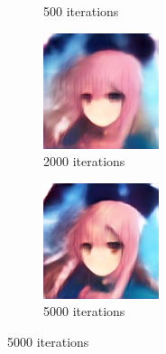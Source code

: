 \documentclass{article}
\begin{document}
\begin{figure}[h!]
\begin{subfigure}[b]{0.24\textwidth}
         \caption{500 iterations}
     \end{subfigure}
     \begin{subfigure}[b]{0.24\textwidth}
         \centering
         \includegraphics[width=\textwidth]{illustration/anime_biggan_2000.png}
         \caption{2000 iterations}
     \end{subfigure}
     \begin{subfigure}[b]{0.24\textwidth}
         \centering
         \includegraphics[width=\textwidth]{illustration/anime_biggan_5000.png}
         \caption{5000 iterations}
     \end{subfigure}
\end{figure}
\end{document}
